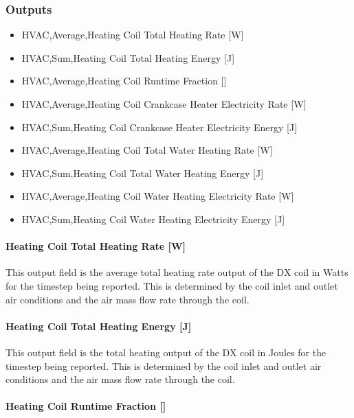 \subsubsection{Outputs}\label{outputs-23}

\begin{itemize}
\item
  HVAC,Average,Heating Coil Total Heating Rate {[}W{]}
\item
  HVAC,Sum,Heating Coil Total Heating Energy {[}J{]}
\item
  HVAC,Average,Heating Coil Runtime Fraction {[]}
\item
  HVAC,Average,Heating Coil Crankcase Heater Electricity Rate {[}W{]}
\item
  HVAC,Sum,Heating Coil Crankcase Heater Electricity Energy {[}J{]}
\item
  HVAC,Average,Heating Coil Total Water Heating Rate {[}W{]}
\item
  HVAC,Sum,Heating Coil Total Water Heating Energy {[}J{]}
\item
  HVAC,Average,Heating Coil Water Heating Electricity Rate {[}W{]}
\item
  HVAC,Sum,Heating Coil Water Heating Electricity Energy {[}J{]}
\end{itemize}

\paragraph{Heating Coil Total Heating Rate {[}W{]}}\label{heating-coil-total-heating-rate-w-6}

This output field is the average total heating rate output of the DX coil in Watts for the timestep being reported. This is determined by the coil inlet and outlet air conditions and the air mass flow rate through the coil.

\paragraph{Heating Coil Total Heating Energy {[}J{]}}\label{heating-coil-total-heating-energy-j-6}

This output field is the total heating output of the DX coil in Joules for the timestep being reported. This is determined by the coil inlet and outlet air conditions and the air mass flow rate through the coil.

\paragraph{Heating Coil Runtime Fraction {[]}}\label{heating-coil-runtime-fraction-4}

